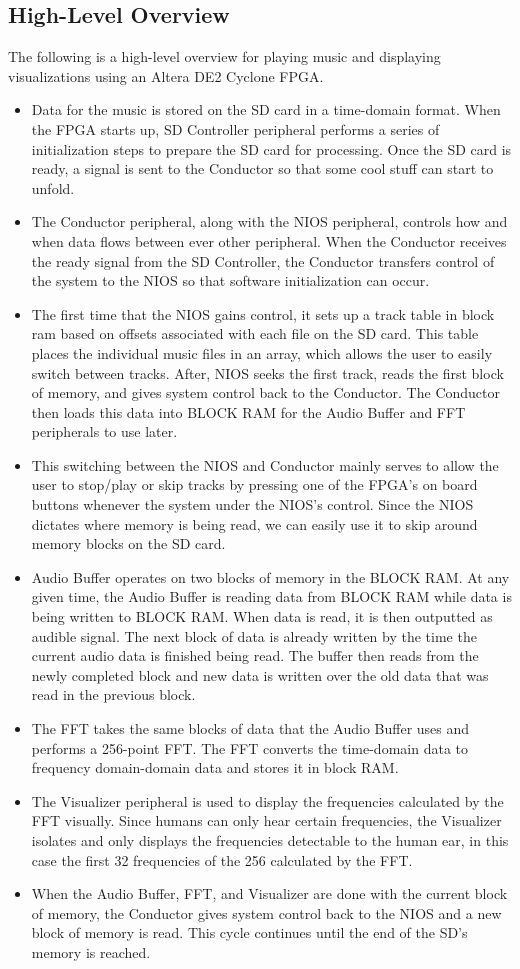 \documentclass{article}
\begin{document}
\subsection{High-Level Overview}
The following is a high-level overview for playing music and displaying visualizations using an Altera DE2 Cyclone FPGA.
\begin{itemize}
	\item Data for the music is stored on the SD card in a time-domain format. When the FPGA starts up, SD Controller peripheral performs a series of initialization steps to prepare the SD card for processing. Once the SD card is ready, a signal is sent to the Conductor so that some cool stuff can start to unfold.
	\item The Conductor peripheral, along with the NIOS peripheral, controls how and when data flows between ever other peripheral. When the Conductor receives the ready signal from the SD Controller, the Conductor transfers control of the system to the NIOS so that software initialization can occur. 
	\item The first time that the NIOS gains control, it sets up a track table in block ram based on offsets associated with each file on the SD card. This table places the individual music files in an array, which allows the user to easily switch between tracks. After, NIOS seeks the first track, reads the first block of memory, and gives system control back to the Conductor. The Conductor then loads this data into BLOCK RAM for the Audio Buffer and FFT peripherals to use later. 
	\item This switching between the NIOS and Conductor mainly serves to allow the user to stop/play or skip tracks by pressing one of the FPGA's on board buttons whenever the system under the NIOS's control. Since the NIOS dictates where memory is being read, we can easily use it to skip around memory blocks on the SD card.
	\item Audio Buffer operates on two blocks of memory in the BLOCK RAM. At any given time, the Audio Buffer is reading data from BLOCK RAM while data is being written to BLOCK RAM. When data is read, it is then outputted as audible signal. The next block of data is already written by the time the current audio data is finished being read. The buffer then reads from the newly completed block and new data is written over the old data that was read in the previous block.
	\item The FFT takes the same blocks of data that the Audio Buffer uses and performs a 256-point FFT. The FFT converts the time-domain data to frequency domain-domain data and stores it in block RAM.
	\item The Visualizer peripheral is used to display the frequencies calculated by the FFT visually. Since humans can only hear certain frequencies, the Visualizer isolates and only displays the frequencies detectable to the human ear, in this case the first 32 frequencies of the 256 calculated by the FFT.
	\item When the Audio Buffer, FFT, and Visualizer are done with the current block of memory, the Conductor gives system control back to the NIOS and a new block of memory is read. This cycle continues until the end of the SD's memory is reached.
\end{itemize}
\end{document}
